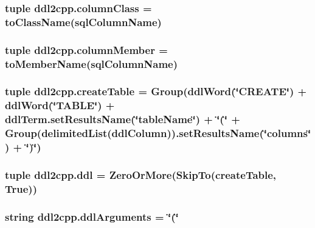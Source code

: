 \subsubsection[{column\+Class}]{\setlength{\rightskip}{0pt plus 5cm}tuple ddl2cpp.\+column\+Class = {\bf to\+Class\+Name}({\bf sql\+Column\+Name})}\label{namespaceddl2cpp_a888fd7048ed5ce41168263718a5d713a}
\hypertarget{namespaceddl2cpp_a2772f4aa8123b99ace6d69e5ad9fea51}{}
\subsubsection[{column\+Member}]{\setlength{\rightskip}{0pt plus 5cm}tuple ddl2cpp.\+column\+Member = {\bf to\+Member\+Name}({\bf sql\+Column\+Name})}\label{namespaceddl2cpp_a2772f4aa8123b99ace6d69e5ad9fea51}
\hypertarget{namespaceddl2cpp_ac9fca86626a318c74c5ef09470e320e3}{}
\subsubsection[{create\+Table}]{\setlength{\rightskip}{0pt plus 5cm}tuple ddl2cpp.\+create\+Table = Group({\bf ddl\+Word}(\char`\"{}C\+R\+E\+A\+T\+E\char`\"{}) + ddl\+Word(\char`\"{}T\+A\+B\+L\+E\char`\"{}) + ddl\+Term.\+set\+Results\+Name(\char`\"{}table\+Name\char`\"{}) + \char`\"{}(\char`\"{} + Group(delimited\+List({\bf ddl\+Column})).set\+Results\+Name(\char`\"{}columns\char`\"{}) + \char`\"{})\char`\"{})}\label{namespaceddl2cpp_ac9fca86626a318c74c5ef09470e320e3}
\hypertarget{namespaceddl2cpp_ab4c4618946f516072a777b7c1f154366}{}
\subsubsection[{ddl}]{\setlength{\rightskip}{0pt plus 5cm}tuple ddl2cpp.\+ddl = Zero\+Or\+More(Skip\+To({\bf create\+Table}, True))}\label{namespaceddl2cpp_ab4c4618946f516072a777b7c1f154366}
\hypertarget{namespaceddl2cpp_ae9ff0a4f026c9fd16644a14821c6ab34}{}
\subsubsection[{ddl\+Arguments}]{\setlength{\rightskip}{0pt plus 5cm}string ddl2cpp.\+ddl\+Arguments = \char`\"{}(\char`\"{}}\label{namespaceddl2cpp_ae9ff0a4f026c9fd16644a14821c6ab34}
\hypertarget{namespaceddl2cpp_adfd7af04711f00ee8c041d1a9dc8a5ff}{}
